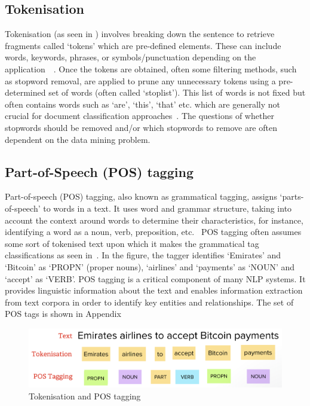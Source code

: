 \subsection{Tokenisation}
Tokenisation (as seen in ) involves breaking down the sentence to retrieve fragments called `tokens' which are pre-defined elements. These can include words, keywords, phrases, or symbols/punctuation depending on the application~\cite{kannan2014preprocessing}~\cite{ieee_named_entity}. Once the tokens are obtained, often some filtering methods, such as stopword removal, are applied to prune any unnecessary tokens using a pre-determined set of words (often called `stoplist'). This list of words is not fixed but often contains words such as `are', `this', `that' etc. which are generally not crucial for document classification approaches~\cite{kannan2014preprocessing}. The questions of whether stopwords should be removed and/or which stopwords to remove are often dependent on the data mining problem.  

\subsection{Part-of-Speech (POS) tagging}

Part-of-speech (POS) tagging, also known as grammatical tagging, assigns `parts-of-speech' to words in a text.  It uses word and grammar structure, taking into account the context around words to determine their characteristics, for instance, identifying a word as a noun, verb, preposition, etc.~\cite{pos} POS tagging often assumes some sort of tokenised text upon which it makes the grammatical tag classifications as seen in~. In the figure, the tagger identifies `Emirates' and `Bitcoin' as `PROPN' (proper nouns), `airlines' and `payments' as `NOUN' and `accept' as `VERB'. POS tagging is a critical component of many NLP systems. It provides linguistic information about the text and enables information extraction from text corpora in order to identify key entities and relationships. 
The set of POS tags is shown in Appendix~

\begin{figure}[H]
\centering
\includegraphics[scale=0.35]{images/token+pos.png}
\caption{Tokenisation and POS tagging}
\label{fig:tokenisation+pos}
\end{figure}

